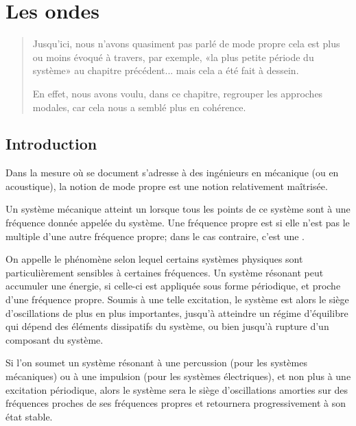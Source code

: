 \chapter{Les ondes}\label{Ch-ondes}
\begin{abstract}
Jusqu'ici, nous n'avons quasiment pas parlé de mode propre cela est plus ou moins évoqué à travers, par exemple, «la plus petite période du système» au chapitre précédent... mais cela a été fait à dessein.

En effet, nous avons voulu, dans ce chapitre, regrouper les approches modales, car cela nous a semblé plus en cohérence.
\end{abstract}

\medskip
\section{Introduction}
Dans la mesure où se document s'adresse à des ingénieurs en mécanique (ou en acoustique), la notion de mode propre est une notion relativement maîtrisée.

\bigskip
Un système mécanique atteint un  lorsque tous les points de ce système sont à une fréquence donnée appelée  du système. Une fréquence propre est  si elle n'est pas le multiple d'une autre fréquence propre; dans le cas contraire, c'est une .

\medskip
On appelle  le phénomène selon lequel certains systèmes physiques sont particulièrement sensibles à certaines fréquences. Un système résonant peut accumuler une énergie, si celle-ci est appliquée sous forme périodique, et proche d'une fréquence propre. Soumis à une telle excitation, le système est alors le siège d'oscillations de plus en plus importantes, jusqu'à atteindre un régime d'équilibre qui dépend des éléments dissipatifs du système, ou bien jusqu'à rupture d'un composant du système.

\medskip
Si l'on soumet un système résonant à une percussion (pour les systèmes mécaniques) ou à une impulsion (pour les systèmes électriques), et non plus à une excitation périodique, alors le système sera le siège d'oscillations amorties sur des fréquences proches de ses fréquences propres et retournera progressivement à son état stable. 


